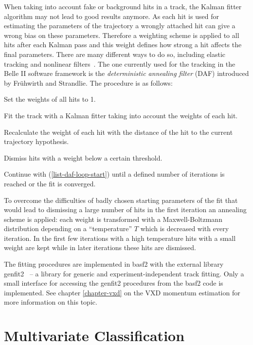 When taking into account fake or background hits in a track, the Kalman fitter algorithm may not lead to good results anymore. As each hit is used for estimating the parameters of the trajectory a wrongly attached hit can give a wrong bias on these parameters. Therefore a weighting scheme is applied to all hits after each Kalman pass and this weight defines how strong a hit affects the final parameters. There are many different ways to do so, including elastic tracking and nonlinear filters~\cite{daf_fruh}. The one currently used for the tracking in the Belle II software framework is the \emph{deterministic annealing filter} (DAF) introduced by Frühwirth and Strandlie. The procedure is as follows:
\begin{zlist}
  \item Set the weights of all hits to 1.
  \item Fit the track with a Kalman fitter taking into account the weights of each hit. \label{list-daf-loop-start}
  \item Recalculate the weight of each hit with the distance of the hit to the current trajectory hypothesis.
  \item Dismiss hits with a weight below a certain threshold.
  \item Continue with (\ref{list-daf-loop-start}) until a defined number of iterations is reached or the fit is converged.
\end{zlist}

To overcome the difficulties of badly chosen starting parameters of the fit that would lead to dismissing a large number of hits in the first iteration an annealing scheme is applied: each weight is transformed with a Maxwell-Boltzmann distribution depending on a ``temperature'' $T$ which is decreased with every iteration. In the first few iterations with a high temperature hits with a small weight are kept while in later iterations these hits are dismissed.

The fitting procedures are implemented in basf2 with the external library genfit2~\cite{genfit} -- a library for generic and experiment-independent track fitting. Only a small interface for accessing the genfit2 procedures from the basf2 code is implemented. See chapter \ref{chapter-vxd} on the VXD momentum estimation for more information on this topic.

\section{Multivariate Classification}

